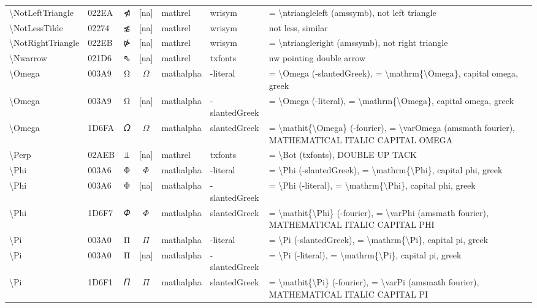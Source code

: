 \documentclass[a4paper,landscape]{article}
\begin{document}
\begin{longtable}{llcclll}
\textbackslash{}NotLeftTriangle & 022EA & ⋪ & [na] & mathrel & wrisym & = \textbackslash{}ntriangleleft (amssymb),  not left triangle \\
\textbackslash{}NotLessTilde & 02274 & ≴ & [na] & mathrel & wrisym & not less, similar \\
\textbackslash{}NotRightTriangle & 022EB & ⋫ & [na] & mathrel & wrisym & = \textbackslash{}ntriangleright (amssymb),  not right triangle \\
\textbackslash{}Nwarrow & 021D6 & ⇖ & [na] & mathrel & txfonts & nw pointing double arrow \\
\textbackslash{}Omega & 003A9 & Ω & $\Omega$ & mathalpha & -literal & = \textbackslash{}Omega (-slantedGreek), = \textbackslash{}mathrm\{\textbackslash{}Omega\}, capital omega, greek \\
\textbackslash{}Omega & 003A9 & Ω & [na] & mathalpha & -slantedGreek & = \textbackslash{}Omega (-literal),  = \textbackslash{}mathrm\{\textbackslash{}Omega\},  capital omega,  greek \\
\textbackslash{}Omega & 1D6FA & 𝛺 & $\Omega$ & mathalpha & slantedGreek & = \textbackslash{}mathit\{\textbackslash{}Omega\} (-fourier), = \textbackslash{}varOmega (amsmath fourier), MATHEMATICAL ITALIC CAPITAL OMEGA \\
\textbackslash{}Perp & 02AEB & ⫫ & [na] & mathrel & txfonts & = \textbackslash{}Bot (txfonts),  DOUBLE UP TACK \\
\textbackslash{}Phi & 003A6 & Φ & $\Phi$ & mathalpha & -literal & = \textbackslash{}Phi (-slantedGreek), = \textbackslash{}mathrm\{\textbackslash{}Phi\}, capital phi, greek \\
\textbackslash{}Phi & 003A6 & Φ & [na] & mathalpha & -slantedGreek & = \textbackslash{}Phi (-literal),  = \textbackslash{}mathrm\{\textbackslash{}Phi\},  capital phi,  greek \\
\textbackslash{}Phi & 1D6F7 & 𝛷 & $\Phi$ & mathalpha & slantedGreek & = \textbackslash{}mathit\{\textbackslash{}Phi\} (-fourier), = \textbackslash{}varPhi (amsmath fourier), MATHEMATICAL ITALIC CAPITAL PHI \\
\textbackslash{}Pi & 003A0 & Π & $\Pi$ & mathalpha & -literal & = \textbackslash{}Pi (-slantedGreek), = \textbackslash{}mathrm\{\textbackslash{}Pi\}, capital pi, greek \\
\textbackslash{}Pi & 003A0 & Π & [na] & mathalpha & -slantedGreek & = \textbackslash{}Pi (-literal),  = \textbackslash{}mathrm\{\textbackslash{}Pi\},  capital pi,  greek \\
\textbackslash{}Pi & 1D6F1 & 𝛱 & $\Pi$ & mathalpha & slantedGreek & = \textbackslash{}mathit\{\textbackslash{}Pi\} (-fourier), = \textbackslash{}varPi (amsmath fourier), MATHEMATICAL ITALIC CAPITAL PI \\

\end{longtable}
\end{document}
